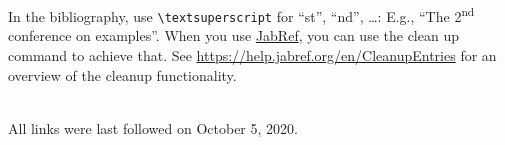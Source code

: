 \documentclass[sigconf,balance]{acmart}
\begin{document}
In the bibliography, use \texttt{\textbackslash textsuperscript} for \enquote{st}, \enquote{nd}, \ldots:
E.g., \enquote{The 2\textsuperscript{nd} conference on examples}.
When you use \href{https://www.jabref.org}{JabRef}, you can use the clean up command to achieve that.
See \url{https://help.jabref.org/en/CleanupEntries} for an overview of the cleanup functionality.




\ \\
%
\noindent
All links were last followed on October 5, 2020.
\end{document}

